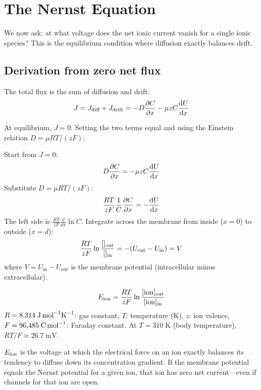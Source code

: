 \section{The Nernst Equation}
\label{sec:nernst}

We now ask: at what voltage does the net ionic current vanish for a single ionic species? This is the equilibrium condition where diffusion exactly balances drift.

\subsection{Derivation from zero net flux}

The total flux is the sum of diffusion and drift:
%
\begin{equation}
  J = J_{\text{diff}} + J_{\text{drift}} = -D \frac{\partial C}{\partial x} - \mu z C \frac{\mathop{}\!\mathrm{d} U}{\mathop{}\!\mathrm{d} x}
  \label{eq:total-flux}
\end{equation}

At equilibrium, $J = 0$. Setting the two terms equal and using the Einstein relation $D = \mu RT / (zF)$:

\begin{derivation}
Start from $J = 0$:
\[
  D \frac{\partial C}{\partial x} = -\mu z C \frac{\mathop{}\!\mathrm{d} U}{\mathop{}\!\mathrm{d} x}
\]
Substitute $D = \mu RT/(zF)$:
\[
  \frac{RT}{zF} \frac{1}{C}\frac{\partial C}{\partial x} = -\frac{\mathop{}\!\mathrm{d} U}{\mathop{}\!\mathrm{d} x}
\]
The left side is $\frac{RT}{zF}\frac{\dd}{\dd x}\ln C$. Integrate across the membrane from inside ($x = 0$) to outside ($x = d$):
\[
  \frac{RT}{zF}\ln\frac{[\mathrm{}]_{\text{out}}}{[\mathrm{}]_{\text{in}}} = -(U_{\text{out}} - U_{\text{in}}) = V
\]
where $V = U_{\text{in}} - U_{\text{out}}$ is the membrane potential (intracellular minus extracellular).
\end{derivation}

\begin{keyequation}
\begin{equation}
  E_{\mathrm{\text{ion}}} = \frac{RT}{zF}\ln\frac{[\mathrm{ion}]_{\text{out}}}{[\mathrm{ion}]_{\text{in}}}
  \label{eq:nernst}
\end{equation}
\tcblower
$R = 8.314\;\text{J\,mol}^{-1}\text{K}^{-1}$: gas constant, $T$: temperature (K), $z$: ion valence, $F = 96{,}485\;\text{C\,mol}^{-1}$: Faraday constant. At $T = 310\;\text{K}$ (body temperature), $RT/F \approx 26.7\;\text{mV}$.
\end{keyequation}

\begin{aside}
$E_{\mathrm{\text{ion}}}$ is the voltage at which the electrical force on an ion exactly balances its tendency to diffuse down its concentration gradient. If the membrane potential equals the Nernst potential for a given ion, that ion has zero net current---even if channels for that ion are open.
\end{aside}

